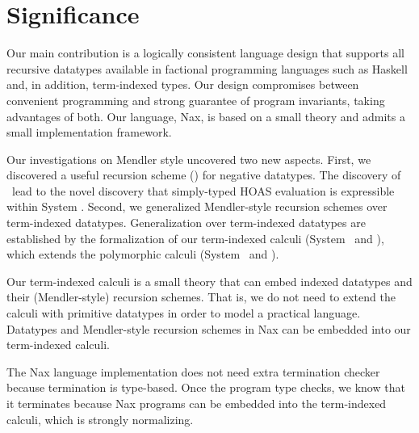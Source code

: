 \section{Significance}\label{sec:concl:sig}
Our main contribution is a logically consistent language design that supports
all recursive datatypes available in factional programming languages such as
Haskell and, in addition, term-indexed types. Our design compromises between
convenient programming and strong guarantee of program invariants, taking
advantages of both. Our language, Nax, is based on a small theory and
admits a small implementation framework.

Our investigations on Mendler style uncovered two new aspects.
First, we discovered a useful recursion scheme (\MsfIt) for negative datatypes.
The discovery of \MsfIt\ lead to the novel discovery that simply-typed HOAS
evaluation is expressible within System \Fw. Second, we generalized
Mendler-style recursion schemes over term-indexed datatypes.
Generalization over term-indexed datatypes are established by
the formalization of our term-indexed calculi (System \Fi\ and \Fixi),
which extends the polymorphic calculi (System \Fw\ and \Fixw).

Our term-indexed calculi is a small theory that can embed indexed datatypes
and their (Mendler-style) recursion schemes. That is, we do not need to extend
the calculi with primitive datatypes in order to model a practical language.
Datatypes and Mendler-style recursion schemes in Nax can be embedded into
our term-indexed calculi.

The Nax language implementation does not need extra termination checker
because termination is type-based. Once the program type checks, we know
that it terminates because Nax programs can be embedded into
the term-indexed calculi, which is strongly normalizing.

